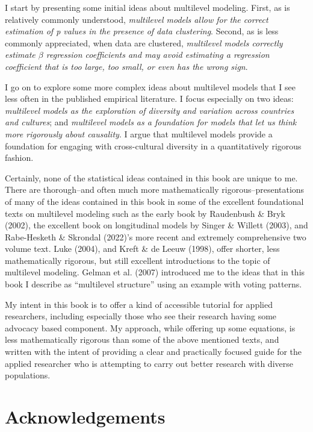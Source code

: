 \documentclass[
  letterpaper,
  DIV=11,
  numbers=noendperiod]{scrreprt}
\begin{document}
I start by presenting some initial ideas about multilevel modeling.
First, as is relatively commonly understood, \emph{multilevel models
allow for the correct estimation of p values in the presence of data
clustering}.  Second, as is less commonly appreciated,
when data are clustered, \emph{multilevel models correctly estimate
\(\beta\) regression coefficients and may avoid estimating a regression
coefficient that is too large, too small, or even has the wrong sign}.

I go on to explore some more complex ideas about multilevel models that
I see less often in the published empirical literature. I focus
especially on two ideas: \emph{multilevel models as the exploration of
diversity and variation across countries and cultures}; and
\emph{multilevel models as a foundation for models that let us think
more rigorously about causality}. I argue that multilevel models provide
a foundation for engaging with cross-cultural diversity in a
quantitatively rigorous fashion.

Certainly, none of the statistical ideas contained in this book are
unique to me. There are thorough--and often much more mathematically
rigorous--presentations of many of the ideas contained in this book in
some of the excellent foundational texts on multilevel modeling such as
the early book by Raudenbush \& Bryk (2002), the excellent book on
longitudinal models by Singer \& Willett (2003), and Rabe-Hesketh \&
Skrondal (2022)'s more recent and extremely comprehensive two volume
text. Luke (2004), and Kreft \& de Leeuw (1998), offer shorter, less
mathematically rigorous, but still excellent introductions to the topic
of multilevel modeling. Gelman et al. (2007) introduced me to the ideas
that in this book I describe as ``multilevel structure'' using an
example with voting patterns.

My intent in this book is to offer a kind of accessible tutorial for
applied researchers, including especially those who see their research
having some advocacy based component. My approach, while offering up
some equations, is less mathematically rigorous than some of the above
mentioned texts, and written with the intent of providing a clear and
practically focused guide for the applied researcher who is attempting
to carry out better research with diverse populations.


\chapter*{Acknowledgements}\label{acknowledgements}
\end{document}
